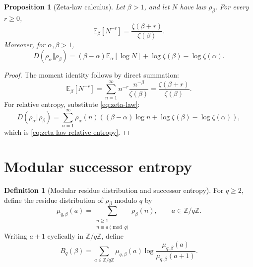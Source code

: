 \documentclass[11pt]{article}
\numberwithin{equation}{section}
\newtheorem{proposition}[theorem]{Proposition}
\theoremstyle{definition}
\newtheorem{definition}[theorem]{Definition}
\theoremstyle{remark}
\newcommand{\E}{\mathbb E}
\newcommand{\Z}{\mathbb Z}
\newcommand{\1}{\mathbf 1}
\begin{document}
\begin{proposition}[Zeta-law calculus]
\label{prop:zeta-law-calculus}
Let \(\beta>1\), and let \(N\) have law \(\rho_\beta\).  For every \(r\ge0\),
\begin{equation}
\label{eq:zeta-law-moment}
\E_\beta[N^{-r}]=\frac{\zeta(\beta+r)}{\zeta(\beta)}.
\end{equation}
Moreover, for \(\alpha,\beta>1\),
\begin{equation}
\label{eq:zeta-law-relative-entropy}
D(\rho_\alpha\Vert\rho_\beta)
=(\beta-\alpha)\E_\alpha[\log N]
+\log\zeta(\beta)-\log\zeta(\alpha).
\end{equation}
\end{proposition}

\begin{proof}
The moment identity follows by direct summation:
\begin{equation}
\label{eq:zeta-law-moment-proof}
\E_\beta[N^{-r}]
=\sum_{n=1}^{\infty}n^{-r}\frac{n^{-\beta}}{\zeta(\beta)}
=\frac{\zeta(\beta+r)}{\zeta(\beta)}.
\end{equation}
For relative entropy, substitute \eqref{eq:zeta-law}:
\begin{equation}
\label{eq:zeta-law-relative-entropy-proof}
D(\rho_\alpha\Vert\rho_\beta)
=\sum_{n=1}^{\infty}\rho_\alpha(n)
\left((\beta-\alpha)\log n+\log\zeta(\beta)-\log\zeta(\alpha)\right),
\end{equation}
which is \eqref{eq:zeta-law-relative-entropy}.
\end{proof}

\section{Modular successor entropy}

\begin{definition}[Modular residue distribution and successor entropy]
\label{def:modular-residue-successor}
For \(q\ge2\), define the residue distribution of \(\rho_\beta\) modulo \(q\) by
\begin{equation}
\label{eq:modular-residue-distribution}
\mu_{q,\beta}(a)=
\sum_{\substack{n\ge1\\ n\equiv a\pmod q}}\rho_\beta(n),
\qquad a\in\Z/q\Z.
\end{equation}
Writing \(a+1\) cyclically in \(\Z/q\Z\), define
\begin{equation}
\label{eq:modular-successor-entropy}
B_q(\beta)=
\sum_{a\in\Z/q\Z}
\mu_{q,\beta}(a)\log\frac{\mu_{q,\beta}(a)}{\mu_{q,\beta}(a+1)}.
\end{equation}
\end{definition}
\end{document}
